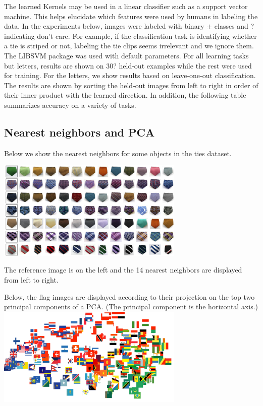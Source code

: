 \documentclass{article}
\begin{document}
The learned Kernels may be used in a linear classifier such as a
support vector machine.  This helps elucidate which features were used
by humans in labeling the data.  In the experiments below, images were
labeled with binary $\pm$ classes and ? indicating don't care.  For
example, if the classification task is identifying whether a tie is
striped or not, labeling the tie clips seems irrelevant and we ignore
them.  The LIBSVM \cite{CC01} package was used with default
parameters.  For all learning tasks but letters, results are shown on
30? held-out examples while the rest were used for training.  For the
letters, we show results based on leave-one-out classification.  The
results are shown by sorting the held-out images from left to right in
order of their inner product with the learned direction.  In addition,
the following table summarizes accuracy on a variety of tasks.

\subsection{Nearest neighbors and PCA}
Below we show the nearest neighbors for some objects in the ties dataset.

{\center \includegraphics[width=3.5in]{neckties_neighs.pdf}}

The reference image is on the left and the 14 nearest neighbors are displayed from left to right.

Below, the flag images are displayed according to their projection on
the top two principal components of a PCA.  (The principal component
is the horizontal axis.)
{\center \includegraphics[width=3.5in]{flags_pca.pdf}}
\end{document}

